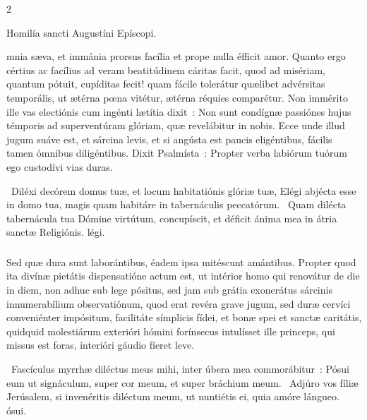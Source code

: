 \documentclass[9pt,twoside]{extarticle}
\begin{document}
\begin{multicols}{2}
\begin{center}Homilía sancti Augustíni Epíscopi.\\
\end{center}
mnia sæva, et immánia prorsus facília et prope nulla éfficit amor. Quanto ergo cértius ac facílius ad veram beatitúdinem cáritas facit, quod ad misériam, quantum pótuit, cupíditas fecit! quam fácile tolerátur quælibet advérsitas temporális, ut ætérna pœna vitétur, ætérna réquies comparétur. Non immérito ille vas electiónis cum ingénti lætítia dixit~: Non sunt condígnæ passiónes hujus témporis ad superventúram glóriam, quæ revelábitur in nobis. Ecce unde illud jugum suáve est, et sárcina levis, et si angústa est paucis eligéntibus, fácilis tamen ómnibus diligéntibus. Dixit Psalmísta~: Propter verba labiórum tuórum ego custodívi vias duras.

\begin{tightlist}{}
\item {}~Diléxi decórem domus tuæ, et locum habitatiónis glóriæ tuæ, \textred{*} Elégi abjécta esse in domo tua, magis quam habitáre in tabernáculis peccatórum. ~Quam dilécta tabernácula tua Dómine virtútum, concupíscit, et déficit ánima mea in átria sanctæ Religiónis. légi.
\end{tightlist}

\subsubsection*{\center {}}
Sed quæ dura sunt laborántibus, éadem ipsa mitéscunt amántibus. Propter quod ita divínæ pietátis dispensatióne actum est, ut intérior homo qui renovátur de die in diem, non adhuc sub lege pósitus, sed jam sub grátia exonerátus sárcinis innumerabílium observatiónum, quod erat revéra grave jugum, sed duræ cervíci conveniénter impósitum, facilitáte símplicis fídei, et bonæ spei et sanctæ caritátis, quidquid molestiárum exterióri hómini forínsecus intulísset ille princeps, qui missus est foras, interióri gáudio fíeret leve.

\begin{tightlist}{}
\item {}~Fascículus myrrhæ diléctus meus mihi, inter úbera mea commorábitur~: \textred{*} Pósui eum ut signáculum, super cor meum, et super bráchium meum. ~Adjúro vos fíliæ Jerúsalem, si invenéritis diléctum meum, ut nuntiétis ei, quia amóre lángueo. ósui.
\end{tightlist}


\end{multicols}
\end{document}
